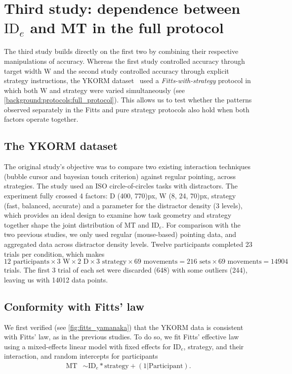 \documentclass[acmlarge, manuscript,review]{acmart}
\newcommand{\mt}{\ensuremath{{\text{MT}}}\xspace}
\newcommand{\ide}{\ensuremath{{\text{ID}_e}}\xspace}
\newcommand{\W}{\ensuremath{{\text{W}}}\xspace}
\begin{document}
\section{ Third study: dependence between \ide and MT in the full protocol \label{sec:yamanaka}}
The third study builds directly on the first two by combining their respective manipulations of accuracy. Whereas the first study controlled accuracy through target width \W and the second study controlled accuracy through explicit strategy instructions, the YKORM dataset~\cite{yamanaka2023} used a \textit{Fitts-with-strategy} protocol in which both \W and strategy were varied simultaneously (see \autoref{background:protocols:full_protocol}). This allows us to test whether the patterns observed separately in the Fitts and pure strategy protocols also hold when both factors operate together.

\subsection{The YKORM dataset}
The original study's objective was to compare two existing interaction techniques (bubble cursor and bayesian touch criterion) against regular pointing, across strategies.
The study used an ISO circle-of-circles tasks with distractors.
The experiment fully crossed 4 factors: D (400, 770)px, W (8, 24, 70)px, strategy (fast, balanced, accurate) and a parameter for the distractor density (3 levels), which provides an ideal design to examine how task geometry and strategy together shape the joint distribution of MT and \ide.
For comparison with the two previous studies, we only used regular (mouse-based) pointing data, and aggregated data across distractor density levels.
Twelve participants completed 23 trials per condition, which makes $12 \text{ participants} \times 3 \text{ W} \times 2 \text{ D} \times 3 \text{ strategy} \times 69 \text{ movements} = 216 \text{ sets} \times 69 \text{ movements} = 14904$ trials. The first 3 trial of each set were discarded (648) with some outliers (244), leaving us with 14012 data points.

\subsection{Conformity with Fitts' law}
We first verified (see \autoref{fig:fitts_yamanaka}) that the YKORM data is consistent with Fitts' law, as in the previous studies. To do so, we fit Fitts' effective law using a mixed-effects linear model with fixed effects for \ide, strategy, and their interaction, and random intercepts for participants
\begin{align}
	\mt & \sim \ide * \text{strategy} + (1|\text{Participant}).
\end{align}
\end{document}
